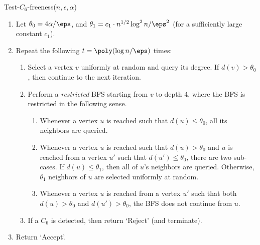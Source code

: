 \medskip\noindent
\textsf{Test-$C_6$-freeness}($n,\epsilon,\alpha$)\label{alg:C6}
\begin{enumerate}
\item Let $\theta_0 = 4 \alpha/\eps$, and $\theta_1 = c_1\cdot n^{1/2}\log^2 n/\eps^2$ 
(for a sufficiently large constant $c_1$).
\item Repeat the following $t= \poly(\log n/\eps)$
times: 
  \begin{enumerate}
     \item Select a vertex $v$ uniformly at random and query its degree.  If $d(v) > \theta_0$, then continue to the next iteration.
     \item Perform a \emph{restricted} BFS starting from $v$ to depth $4$, %
     where the BFS is restricted in the following sense.
         \begin{enumerate}
           \item Whenever a vertex $u$ is reached such that $d(u) \leq \theta_0$, all its neighbors are queried.
           \item Whenever a vertex $u$ is reached such that $d(u) > \theta_0$ and $u$ is reached from a vertex $u'$ such that $d(u') \leq \theta_0$, there are two sub-cases. If $d(u) \leq \theta_1$, then  all of $u$'s neighbors are queried. Otherwise,  $\theta_1$ neighbors of $u$ are selected uniformly at random. \label{step:C6_rand_nbr}
           \item Whenever a vertex $u$ is reached from a vertex $u'$ such that both $d(u)>\theta_0$ and $d(u') > \theta_0$, the BFS does not continue from $u$.
         \end{enumerate}
     \item If a $C_6$ is detected, then return `Reject' (and terminate).

    \end{enumerate}
  \item Return `Accept'.
\end{enumerate}

